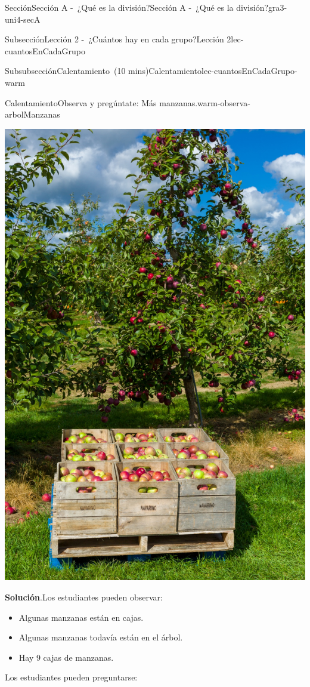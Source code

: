 \documentclass[oneside,10pt,]{article}
\newcommand{\blocktitlefont}{\relax}
\begin{document}
\begin{sectionptx}{Sección}{Sección A -~¿Qué es la división?}{}{Sección A -~¿Qué es la división?}{}{}{gra3-uni4-secA}
\begin{subsectionptx}{Subsección}{Lección 2 -~¿Cuántos hay en cada grupo?}{}{Lección 2}{}{}{lec-cuantosEnCadaGrupo}
\begin{subsubsectionptx}{Subsubsección}{Calentamiento~(10 mins)}{}{Calentamiento}{}{}{lec-cuantosEnCadaGrupo-warm}
\begin{exploration}{Calentamiento}{Observa y pregúntate: Más manzanas.}{warm-observa-arbolManzanas}
\begin{image}{0.15}{0.7}{0.15}{}
\includegraphics[width=\linewidth]{external/jpg-source/3.4.A2 Warm-up.jpg}
\end{image}%
\par\smallskip%
\noindent\textbf{\blocktitlefont Solución}.\hypertarget{warm-observa-arbolManzanas-3}{}\quad{}Los estudiantes pueden observar:%
\begin{itemize}[label=\textbullet]
\item{}Algunas manzanas están en cajas.%
\item{}Algunas manzanas todavía están en el árbol.%
\item{}Hay 9 cajas de manzanas.%
\end{itemize}
%
\par
Los estudiantes pueden preguntarse:%
\begin{itemize}[label=\textbullet]

\end{itemize}
\end{exploration}
\end{subsubsectionptx}
\end{subsectionptx}
\end{sectionptx}
\end{document}
